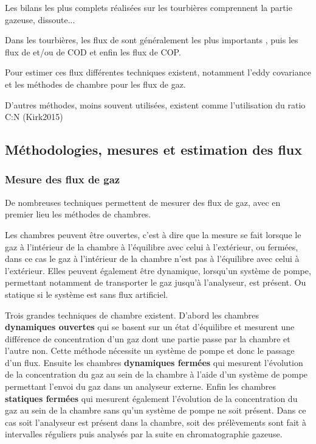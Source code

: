 Les bilans les plus complets réalisées sur les tourbières comprennent la partie gazeuse, dissoute...

Dans les tourbières, les flux de \coo sont généralement les plus importants \plop, puis les flux de \chh et/ou de COD et enfin les flux de COP.

Pour estimer ces flux différentes techniques existent, notamment l'eddy covariance et les méthodes de chambre pour les flux de gaz.

D'autres méthodes, moins souvent utilisées, existent comme l'utilisation du ratio C:N (Kirk2015)

\subsection{Méthodologies, mesures et estimation des flux}

\subsubsection{Mesure des flux de gaz}

De nombreuses techniques permettent de mesurer des flux de gaz, avec en premier lieu les méthodes de chambres.


Les chambres peuvent être ouvertes, c'est à dire que la mesure se fait lorsque le gaz à l'intérieur de la chambre à l'équilibre avec celui à l'extérieur, ou fermées, dans ce cas le gaz à l'intérieur de la chambre n'est pas à l'équilibre avec celui à l'extérieur.
Elles peuvent également être dynamique, lorsqu'un système de pompe, permettant notamment de transporter le gaz jusqu'à l'analyseur, est présent.
Ou statique si le système est sans flux artificiel.

Trois grandes techniques de chambre existent.
D'abord les chambres \textbf{dynamiques ouvertes} qui se basent sur un état d'équilibre et mesurent une différence de concentration d'un gaz dont une partie passe par la chambre et l'autre non. 
Cette méthode nécessite un système de pompe et donc le passage d'un flux.
Ensuite les chambres \textbf{dynamiques fermées} qui mesurent l'évolution de la concentration du gaz au sein de la chambre à l'aide d'un système de pompe permettant l'envoi du gaz dans un analyseur externe.
Enfin les chambres \textbf{statiques fermées} qui mesurent également l'évolution de la concentration du gaz au sein de la chambre sans qu'un système de pompe ne soit présent.
Dans ce cas soit l'analyseur est présent dans la chambre, soit des prélèvements sont fait à intervalles réguliers puis analysés par la suite en chromatographie gazeuse.

